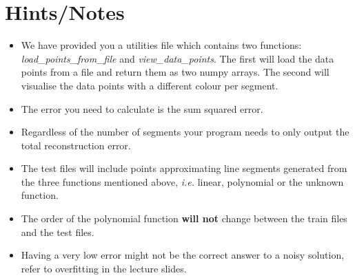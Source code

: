 \documentclass[12pt]{article}
\begin{document}
\section{Hints/Notes}
\label{sec:hints/notes}
\begin{itemize}
    \item We have provided you a utilities file which contains two functions: \textit{load\_points\_from\_file} and \textit{view\_data\_points}.
        The first will load the data points from a file and return them as two numpy arrays.
        The second will visualise the data points with a different colour per segment.
    \item The error you need to calculate is the sum squared error. 
    \item Regardless of the number of segments your program needs to only output the total reconstruction error. 
    \item The test files will include points approximating line segments generated from the three functions mentioned above, \textit{i.e.} linear, polynomial or the unknown function. 
    \item The order of the polynomial function \textbf{will not} change between the train files and the test files.
    \item Having a very low error might not be the correct answer to a noisy solution, refer to overfitting in the lecture slides. 
\end{itemize}
\end{document}
